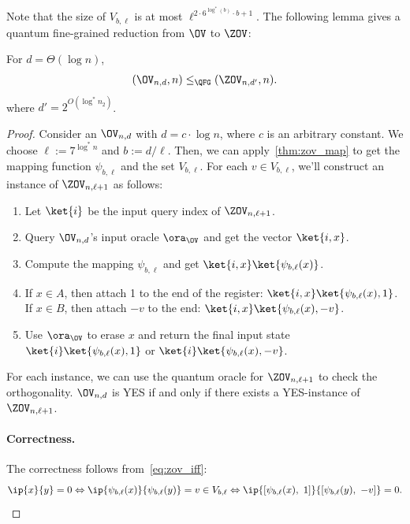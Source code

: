 Note that the size of $V_{b,\ell}$ is at most $\ell^{2\cdot 6^{\log^* (b)}\cdot b+1}$. 
The following lemma gives a quantum fine-grained reduction from $\OV$ to $\ZOV$:
\begin{lemma}\label{lem:ov_2_zov}
For $d=\Theta(\log n)$,
\begin{align}
    (\OV_{n,d}, n)\leq_{\QFG} (\ZOV_{n,d'}, n).
\end{align}
where $d'=2^{O(\log^* n_2)}$.
\end{lemma}
\begin{proof}
Consider an $\OV_{n,d}$ with $d=c\cdot \log n$, where $c$ is an arbitrary constant. We choose $\ell:=7^{\log^* n}$ and $b:=d/\ell$. Then, we can apply~\cref{thm:zov_map} to get the mapping function $\psi_{b,\ell}$ and the set $V_{b,\ell}$. For each $v\in V_{b,\ell}$, we'll construct an instance of $\ZOV_{n,\ell+1}$ as follows:
\begin{enumerate}
    \item Let $\ket{i}$ be the input query index of $\ZOV_{n,\ell+1}$.  
    \item Query $\OV_{n,d}$'s input oracle $\ora_{\OV}$ and get the vector $\ket{i,x}$.
    \item Compute the mapping $\psi_{b,\ell}$ and get $\ket{i,x}\ket{\psi_{b,\ell}(x)}$.
    \item If $x\in A$, then attach 1 to the end of the register: $\ket{i,x}\ket{\psi_{b,\ell}(x),1}$. If $x\in B$, then attach $-v$ to the end: $\ket{i,x}\ket{\psi_{b,\ell}(x),-v}$.
    \item Use $\ora_{\OV}$ to erase $x$ and return the final input state $\ket{i}\ket{\psi_{b,\ell}(x),1}$ or $\ket{i}\ket{\psi_{b,\ell}(x),-v}$.
\end{enumerate}
For each instance, we can use the quantum oracle for $\ZOV_{n,\ell+1}$ to check the orthogonality. $\OV_{n,d}$ is YES if and only if there exists a YES-instance of $\ZOV_{n,\ell+1}$.

\paragraph*{Correctness.} The correctness follows from~\cref{eq:zov_iff}: 
\begin{align}
\ip{x}{y}=0 \Leftrightarrow \ip{\psi_{b,\ell}(x)}{\psi_{b,\ell}(y)}=v\in V_{b,\ell} \Leftrightarrow \ip{[\psi_{b , \ell}(x), ~ 1]}{[\psi_{b,\ell}(y), ~ -v]}=0. 
\end{align}


\end{proof}
